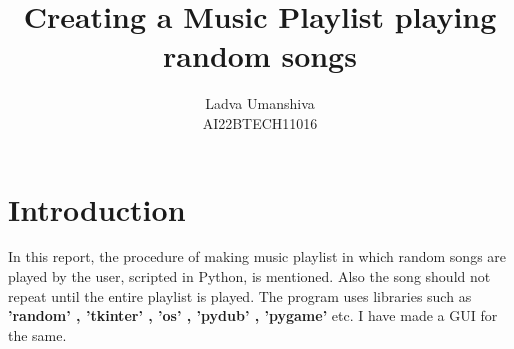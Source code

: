 \documentclass[journal,12pt,twocolumn]{IEEEtran}
\begin{document}
\let\vec\mathbf




\vspace{3cm}

\title{
	\textbf{Creating a Music Playlist playing random songs}
}
\author{
	Ladva Umanshiva

	AI22BTECH11016
}

\maketitle

\newpage

\bigskip
\renewcommand{\thefigure}{\theenumi}
\renewcommand{\thetable}{\theenumi}
\section*{\textbf{Introduction}}
In this report, the procedure of making music playlist in which random songs are played by the user, scripted in Python, is mentioned. Also the song should not repeat until the entire playlist is played. The program uses libraries such as \textbf{'random' , 'tkinter' , 'os' , 'pydub' , 'pygame' } etc. I have made a GUI for the same.
\end{document}
